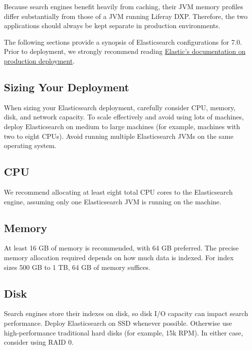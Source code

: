 Because search engines benefit heavily from caching, their JVM memory
profiles differ substantially from those of a JVM running Liferay DXP.
Therefore, the two applications should always be kept separate in
production environments.

The following sections provide a synopsis of Elasticsearch
configurations for 7.0. Prior to deployment, we strongly recommend
reading
\href{https://www.elastic.co/guide/en/elasticsearch/guide/current/index.html}{Elastic's
documentation on production deployment}.

\subsection{Sizing Your Deployment}\label{sizing-your-deployment}

When sizing your Elasticsearch deployment, carefully consider CPU,
memory, disk, and network capacity. To scale effectively and avoid using
lots of machines, deploy Elasticsearch on medium to large machines (for
example, machines with two to eight CPUs). Avoid running multiple
Elasticsearch JVMs on the same operating system.

\subsection{CPU}\label{cpu}

We recommend allocating at least eight total CPU cores to the
Elasticsearch engine, assuming only one Elasticsearch JVM is running on
the machine.

\subsection{Memory}\label{memory}

At least 16 GB of memory is recommended, with 64 GB preferred. The
precise memory allocation required depends on how much data is indexed.
For index sizes 500 GB to 1 TB, 64 GB of memory suffices.

\subsection{Disk}\label{disk}

Search engines store their indexes on disk, so disk I/O capacity can
impact search performance. Deploy Elasticsearch on SSD whenever
possible. Otherwise use high-performance traditional hard disks (for
example, 15k RPM). In either case, consider using RAID 0.

